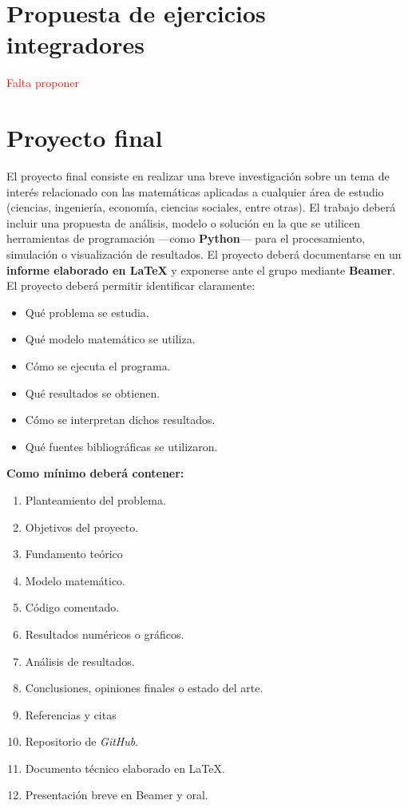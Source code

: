 \documentclass[12pt,letterpaper]{article}
\newcommand{\latexname}{\LaTeX}
\newcommand{\github}{\textit{GitHub}}
\begin{document}
\section{Propuesta de ejercicios integradores}
{\textcolor{red}{Falta proponer}}

\section{Proyecto final}

El proyecto final consiste en realizar una breve investigación sobre un tema de interés relacionado con las matemáticas aplicadas a cualquier área de estudio (ciencias, ingeniería, economía, ciencias sociales, entre otras). El trabajo deberá incluir una propuesta de análisis, modelo o solución en la que se utilicen herramientas de programación —como \textbf{Python}— para el procesamiento, simulación o visualización de resultados. El proyecto deberá documentarse en un \textbf{informe elaborado en LaTeX} y exponerse ante el grupo mediante \textbf{Beamer}.\\

El proyecto deberá permitir identificar claramente:

\begin{itemize}[noitemsep]
    \item Qué problema se estudia.
    \item Qué modelo matemático se utiliza.
    \item Cómo se ejecuta el programa.
    \item Qué resultados se obtienen.
    \item Cómo se interpretan dichos resultados.
    \item Qué fuentes bibliográficas se utilizaron.
\end{itemize}


\textbf{Como mínimo deberá contener:}

\begin{enumerate}[noitemsep]
    \item Planteamiento del problema.
    \item Objetivos del proyecto.
    \item Fundamento teórico
    \item Modelo matemático.
    \item Código comentado.
    \item Resultados numéricos o gráficos.
    \item Análisis de resultados.
    \item  Conclusiones, opiniones finales o estado del arte.
    \item Referencias y citas
    \item Repositorio de \github.
    \item Documento técnico elaborado en \latexname.
    \item Presentación breve en Beamer y oral.
\end{enumerate}
\end{document}
